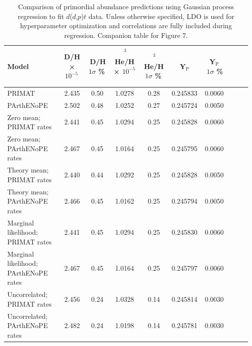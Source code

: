 \documentclass[%
 reprint,
superscriptaddress,
nofootinbib,
 amsmath,amssymb,
 aps,
 pra,
]{revtex4-2}
\begin{document}
\begin{table}[ht]
    \centering
    \caption{Comparison of primordial abundance predictions using Gaussian process regression to fit $d$($d$,$p$)$t$ data. Unless otherwise specified, LDO is used for hyperparameter optimization and correlations are fully included during regression. Companion table for Figure 7.}
    \small
    \begin{tabular}{l
                    S[table-format=1.6]
                    S[table-format=1.5]
                    S[table-format=1.3]
                    S[table-format=1.6]
                    S[table-format=1.5]
                    S[table-format=1.3]
                    S[table-format=1.6]
                    S[table-format=1.7]
                    S[table-format=1.4]} 
     \toprule
    {Model} & {D/H × $10^{-5}$\,} & {\,D/H $1\sigma$ \%\,} &
    {\,$^3$He/H × $10^{-5}$\,} & {\,$^3$He/H $1\sigma$ \%\,} &
    {\,Y$_\text{P}$\,} & {\,Y$_\text{P}\,$ $\,1\sigma$ \%} \\
    \midrule
    PRIMAT & 2.435 & 0.50 & 1.0278 & 0.28 & 0.245833 & 0.0060 \\
    PArthENoPE & 2.502 & 0.48 & 1.0252 & 0.27 & 0.245724 & 0.0050 \\
    Zero mean; PRIMAT rates & 2.441 & 0.45 & 1.0294 & 0.25 & 0.245828 & 0.0060 \\
    Zero mean; PArthENoPE rates & 2.467 & 0.45 & 1.0164 & 0.25 & 0.245795 & 0.0060 \\
    Theory mean; PRIMAT rates & 2.440 & 0.44 & 1.0292 & 0.25 & 0.245828 & 0.0050 \\
    Theory mean; PArthENoPE rates & 2.466 & 0.45 & 1.0162 & 0.25 & 0.245794 & 0.0050 \\
    Marginal likelihood; PRIMAT rates & 2.441 & 0.45 & 1.0294 & 0.25 & 0.245830 & 0.0060 \\
    Marginal likelihood; PArthENoPE rates & 2.467 & 0.45 & 1.0164 & 0.25 & 0.245797 & 0.0060 \\
    Uncorrelated; PRIMAT rates & 2.456 & 0.24 & 1.0328 & 0.14 & 0.245814 & 0.0030 \\
    Uncorrelated; PArthENoPE rates & 2.482 & 0.24 & 1.0198 & 0.14 & 0.245781 & 0.0030 \\
    \bottomrule
    \end{tabular}
\end{table}
\end{document}
